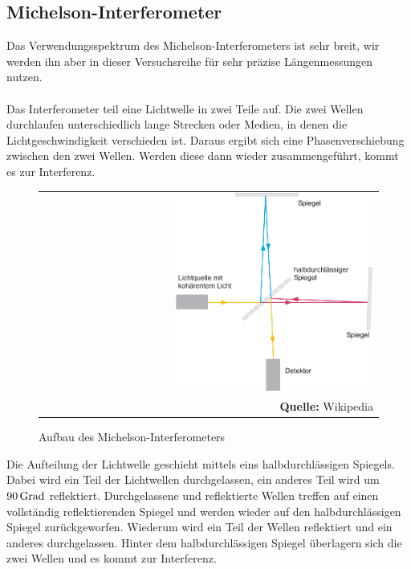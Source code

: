 \documentclass[a4paper,titlepage]{scrartcl}
\numberwithin{equation}{section}
\begin{document}
\subsection{Michelson-Interferometer}
Das Verwendungsspektrum des Michelson-Interferometers ist sehr breit, wir werden ihn aber in dieser Versuchsreihe für sehr präzise Längenmessungen nutzen.\\ \\
Das Interferometer teil eine Lichtwelle in zwei Teile auf. Die zwei Wellen durchlaufen unterschiedlich lange Strecken oder Medien, in denen die Lichtgeschwindigkeit verschieden ist. Daraus ergibt sich eine Phasenverschiebung zwischen den zwei Wellen. Werden diese dann wieder zusammengeführt, kommt es zur Interferenz.
\begin{figure}[H]
	\centering
	\begin{tabular}{@{}r@{}}
		\includegraphics[width=0.6\textwidth]{Bilder/michelson.png}\\
		\footnotesize\sffamily\textbf{Quelle:} Wikipedia \cite{wiki:michelson}
	\end{tabular}
	\caption{Aufbau des Michelson-Interferometers}
	\label{fig:michelson}
\end{figure}
Die Aufteilung der Lichtwelle geschieht mittels eins halbdurchlässigen Spiegels. Dabei wird ein Teil der Lichtwellen durchgelassen, ein anderes Teil wird um $\unit[90]{Grad}$ reflektiert. Durchgelassene und reflektierte Wellen treffen auf einen vollständig reflektierenden Spiegel und werden wieder auf den halbdurchlässigen Spiegel zurückgeworfen. Wiederum wird ein Teil der Wellen reflektiert und ein anderes durchgelassen. Hinter dem halbdurchlässigen Spiegel überlagern sich die zwei Wellen und es kommt zur Interferenz.\\ \\
\end{document}
